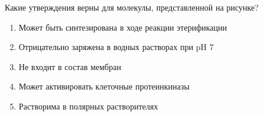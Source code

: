 
Какие утверждения верны для
молекулы, представленной на рисунке?


\begin{enumerate}
    \item Может быть синтезирована в ходе реакции этерификации
    \item Отрицательно заряжена в водных растворах при pH 7
    \item Не входит в состав мембран
    \item Может активировать клеточные протеинкиназы
    \item Растворима в полярных растворителях
\end{enumerate}



